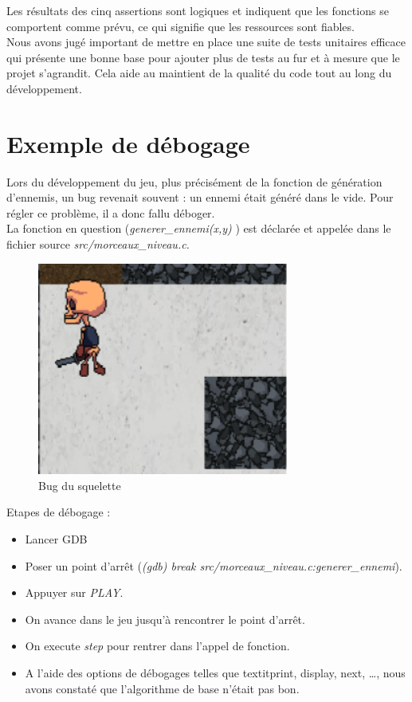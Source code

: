 \documentclass[a4paper,12pt]{article}
\begin{document}
Les résultats des cinq assertions sont logiques et indiquent que les fonctions se comportent comme prévu, ce qui signifie que les ressources sont fiables.\\
Nous avons jugé important de mettre en place une suite de tests unitaires efficace qui présente une bonne base pour ajouter plus de tests au fur et à mesure que le projet s'agrandit. Cela aide au maintient de la qualité du code tout au long du développement.
\section{Exemple de débogage}
Lors du développement du jeu, plus précisément de la fonction de génération d'ennemis, un bug revenait souvent : un ennemi était généré dans le vide. Pour régler ce problème, il a donc fallu déboger.\\
La fonction en question (\textit{generer\_ennemi(x,y)} ) est déclarée et appelée dans le fichier source \textit{src/morceaux\_niveau.c.}\\
\begin{figure}[h]
	\centering
	\includegraphics[height=7cm]{img/bug.png}
	\caption{Bug du squelette}
	\label{Bug}
\end{figure}
Etapes de débogage : 
\begin{itemize}
	\item Lancer GDB
	\item Poser un point d'arrêt (\textit{(gdb) break src/morceaux\_niveau.c:generer\_ennemi}).
	\item Appuyer sur \textit{PLAY}.
	\item On avance dans le jeu jusqu'à rencontrer le point d'arrêt.
	\item On execute \textit{step} pour rentrer dans l'appel de fonction.
	\item A l'aide des options de débogages telles que textit{print, display, next, \dots}, nous avons constaté que l'algorithme de base n'était pas bon.
\end{itemize}
\end{document}
